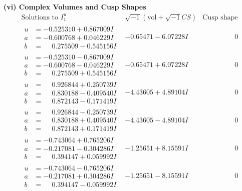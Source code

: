 \documentclass[1p]{elsarticle_modified}
\theoremstyle{definition}
\newcommand{\I}{\sqrt{-1}}
\begin{document}
\newpage\flushleft \textbf{(vi) Complex Volumes and Cusp Shapes}
$$\begin{array}{c|c|c}  
\text{Solutions to }I^u_{1}& \I (\text{vol} + \sqrt{-1}CS) & \text{Cusp shape}\\
 \hline 
\begin{aligned}
u &= -0.525310 + 0.867009 I \\
a &= -0.600768 + 0.046229 I \\
b &= \phantom{-}0.275509 - 0.545156 I\end{aligned}
 & -0.65471 - 6.07228 I & \phantom{-0.000000 } 0 \\ \hline\begin{aligned}
u &= -0.525310 - 0.867009 I \\
a &= -0.600768 - 0.046229 I \\
b &= \phantom{-}0.275509 + 0.545156 I\end{aligned}
 & -0.65471 + 6.07228 I & \phantom{-0.000000 } 0 \\ \hline\begin{aligned}
u &= \phantom{-}0.926844 + 0.250739 I \\
a &= \phantom{-}0.830188 - 0.409540 I \\
b &= \phantom{-}0.872143 - 0.171419 I\end{aligned}
 & -4.43605 + 4.89104 I & \phantom{-0.000000 } 0 \\ \hline\begin{aligned}
u &= \phantom{-}0.926844 - 0.250739 I \\
a &= \phantom{-}0.830188 + 0.409540 I \\
b &= \phantom{-}0.872143 + 0.171419 I\end{aligned}
 & -4.43605 - 4.89104 I & \phantom{-0.000000 } 0 \\ \hline\begin{aligned}
u &= -0.743064 + 0.765206 I \\
a &= -0.217081 - 0.304286 I \\
b &= \phantom{-}0.394147 + 0.059992 I\end{aligned}
 & -1.25651 + 8.15591 I & \phantom{-0.000000 } 0 \\ \hline\begin{aligned}
u &= -0.743064 - 0.765206 I \\
a &= -0.217081 + 0.304286 I \\
b &= \phantom{-}0.394147 - 0.059992 I\end{aligned}
 & -1.25651 - 8.15591 I & \phantom{-0.000000 } 0 \\ \hline\begin{aligned}

\end{aligned}
\end{array}$$
\end{document}
